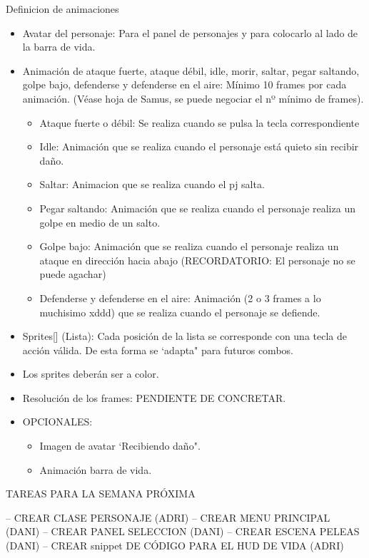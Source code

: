 \documentclass[10pt,a4paper,titlepage]{article}
\begin{document}
Definicion de animaciones 
\begin{itemize}
	\item Avatar del personaje: Para el panel de personajes y para colocarlo al lado de la barra de vida.
	\item Animación de ataque fuerte, ataque débil, idle, morir, saltar, pegar saltando, golpe bajo, defenderse y defenderse en el aire: Mínimo 10 frames por cada animación. (Véase hoja de Samus, se puede negociar el nº mínimo de frames).
	\begin{itemize}
		\item Ataque fuerte o débil: Se realiza cuando se pulsa la tecla correspondiente
		\item Idle: Animación que se realiza cuando el personaje está quieto sin recibir daño.
		\item Saltar: Animacion que se realiza cuando el pj salta.
		\item Pegar saltando: Animación que se realiza cuando el personaje realiza un golpe en medio de un salto.
		\item Golpe bajo: Animación que se realiza cuando el personaje realiza un ataque en dirección hacia abajo (RECORDATORIO: El personaje no se puede agachar)
		\item Defenderse y defenderse en el aire: Animación (2 o 3 frames a lo muchisimo xddd) que se realiza cuando el personaje se defiende.
	\end{itemize}
	\item Sprites[] (Lista): Cada posición de la lista se corresponde con una tecla de acción válida. De esta forma se `adapta" para futuros combos.
	\item Los sprites deberán ser a color.
	\item Resolución de los frames: PENDIENTE DE CONCRETAR.
	\item OPCIONALES: 
	\begin{itemize}
		\item Imagen de avatar `Recibiendo daño".
		\item Animación barra de vida.
	\end{itemize}
\end{itemize}


TAREAS PARA LA SEMANA PRÓXIMA

-- CREAR CLASE PERSONAJE (ADRI)
-- CREAR MENU PRINCIPAL (DANI)
-- CREAR PANEL SELECCION (DANI)
-- CREAR ESCENA PELEAS (DANI)
-- CREAR snippet DE CÓDIGO PARA EL HUD DE VIDA (ADRI)
\end{document}
